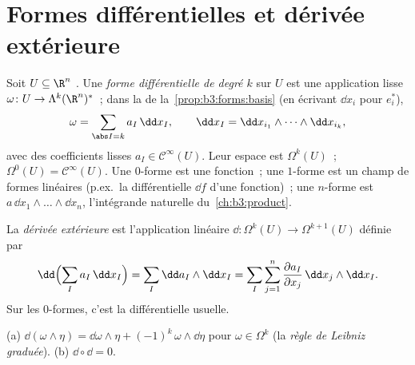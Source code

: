 \section{Formes différentielles et dérivée extérieure}

\begin{definition}\label{def:b3:forms:diffform}
Soit $U \subseteq \R^n$ . Une \emph{forme
différentielle de degré $k$} sur
$U$ est une application lisse $\omega\colon U \to
\Lambda^k(\R^n)^*$~; dans la 
de la~\cref{prop:b3:forms:basis} (en écrivant $\dd x_i$ pour
$e_i^*$),
\[
\omega = \sum_{\abs I = k} a_I\,\dd x_I,
\qquad
\dd x_I = \dd x_{i_1} \wedge \dots \wedge \dd x_{i_k},
\]
avec des coefficients lisses $a_I \in \mathcal C^\infty(U)$.
Leur espace est $\Omega^k(U)$~; $\Omega^0(U) = \mathcal
C^\infty(U)$. Une $0$-forme est une fonction~; une $1$-forme
est un champ de formes linéaires (p.ex.\ la différentielle
$\dd f$ d'une fonction)~; une $n$-forme est $a\,\dd
x_1\wedge\dots\wedge\dd x_n$, l'intégrande naturelle
du~\cref{ch:b3:product}.
\end{definition}

\begin{definition}\label{def:b3:forms:d}
La \emph{dérivée extérieure} est
l'application linéaire $\dd\colon \Omega^k(U) \to
\Omega^{k+1}(U)$ définie par
\[
\dd\Bigl(\sum_I a_I\,\dd x_I\Bigr)
= \sum_I \dd a_I \wedge \dd x_I
= \sum_I\sum_{j=1}^n \frac{\partial a_I}{\partial
x_j}\,\dd x_j \wedge \dd x_I .
\]
Sur les $0$-formes, c'est la différentielle usuelle.
\end{definition}

\begin{theorem}\label{thm:b3:forms:dsquare}
(a) $\dd(\omega \wedge \eta) = \dd\omega \wedge \eta +
(-1)^k\,\omega \wedge \dd\eta$ pour $\omega \in \Omega^k$
(la \emph{règle de Leibniz graduée}).
(b) $\dd \circ \dd = 0$.
\end{theorem}

